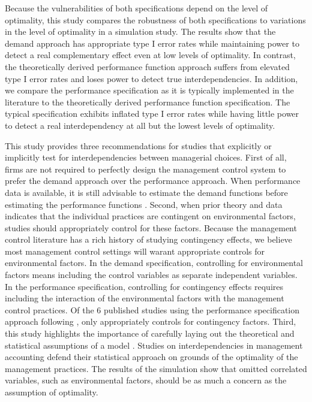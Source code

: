 \documentclass[12pt]{article}
\begin{document}
Because the vulnerabilities of both specifications depend on the level of optimality, this study compares the robustness of both specifications to variations in the level of optimality in a simulation study. The results show that the demand approach has appropriate type I error rates while maintaining power to detect a real complementary effect even at low levels of optimality. In contrast, the theoretically derived performance function approach suffers from elevated type I error rates and loses power to detect true interdependencies. In addition, we compare the performance specification as it is typically implemented in the literature to the theoretically derived performance function specification. The typical specification exhibits inflated type I error rates while having little power to detect a real interdependency at all but the lowest levels of optimality.

This study provides three recommendations for studies that explicitly or implicitly test for interdependencies between managerial choices. First of all, firms are not required to perfectly design the management control system to prefer the demand approach over the performance approach. When performance data is available, it is still advisable to estimate the demand functions before estimating the performance functions \citep{Aral2012, Cassiman2006}. Second, when prior theory and data indicates that the individual practices are contingent on environmental factors, studies should appropriately control for these factors. Because the management control literature has a rich history of studying contingency effects, we believe most management control settings will warant appropriate controls for environmental factors. In the demand specification, controlling for environmental factors means including the control variables as separate independent variables. In the performance specification, controlling for contingency effects requires including the interaction of the environmental factors with the management control practices. Of the 6 published studies using the performance specification approach following \citet{Grabner2013}, only \citet{Bedford2016} appropriately controls for contingency factors. Third, this study highlights the importance of carefully laying out the theoretical and statistical assumptions of a model \citep{Chenhall2007}. Studies on interdependencies in management accounting defend their statistical approach on grounds of the optimality of the management practices. The results of the simulation show that omitted correlated variables, such as environmental factors, should be as much a concern as the assumption of optimality.
\end{document}

